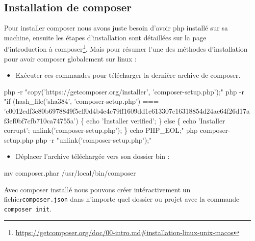 \documentclass[11pt,a4paper,krantz2,11pt,oneside]{krantz}
\newenvironment{Shaded}{\begin{snugshade}}{\end{snugshade}}
\newcommand{\ExtensionTok}[1]{#1}
\newcommand{\FunctionTok}[1]{\textcolor[rgb]{0,0,0}{#1}}
\newcommand{\NormalTok}[1]{#1}
\newcommand{\StringTok}[1]{\textcolor[rgb]{0.5,0.5,0.5}{#1}}
\providecommand{\tightlist}{%
  \setlength{\itemsep}{0pt}\setlength{\parskip}{0pt}}
\renewcommand{\href}[2]{#2\footnote{\url{#1}}}
\begin{document}
\hypertarget{install-composer}{%
\subsection{Installation de composer}\label{install-composer}}

Pour installer composer nous avons juste besoin d'avoir php installé sur sa machine, ensuite les étapes d'installation sont détaillées sur la page d'\href{https://getcomposer.org/doc/00-intro.md\#installation-linux-unix-macos}{introduction à composer}. Mais pour résumer l'une des méthodes d'installation pour avoir composer globalement sur linux :

\begin{itemize}
\tightlist
\item
  Exécuter ces commandes pour télécharger la dernière archive de composer.
\end{itemize}

\begin{Shaded}
\begin{Highlighting}[]
\ExtensionTok{php}\NormalTok{ -r }\StringTok{"copy('https://getcomposer.org/installer', 'composer-setup.php');"}
\ExtensionTok{php}\NormalTok{ -r }\StringTok{"if (hash_file('sha384', 'composer-setup.php') === 'e0012edf3e80b6978849f5eff0d4b4e4c79ff1609dd1e613307e16318854d24ae64f26d17af3ef0bf7cfb710ca74755a') \{ echo 'Installer verified'; \} else \{ echo 'Installer corrupt'; unlink('composer-setup.php'); \} echo PHP_EOL;"}
\ExtensionTok{php}\NormalTok{ composer-setup.php}
\ExtensionTok{php}\NormalTok{ -r }\StringTok{"unlink('composer-setup.php');"}
\end{Highlighting}
\end{Shaded}

\begin{itemize}
\tightlist
\item
  Déplacer l'archive téléchargée vers son dossier bin :
\end{itemize}

\begin{Shaded}
\begin{Highlighting}[]
\FunctionTok{mv}\NormalTok{ composer.phar /usr/local/bin/composer}
\end{Highlighting}
\end{Shaded}

Avec composer installé nous pouvons créer intéractivement un fichier\texttt{composer.json} dans n'importe quel dossier ou projet avec la commande \texttt{composer\ init}.
\end{document}
